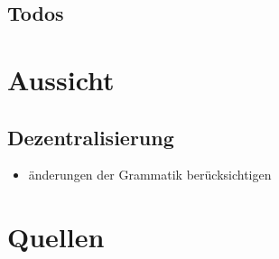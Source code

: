 \documentclass[]{article}
\begin{document}
\subsection*{Todos}

\listoftodos[Notes]




\section{Aussicht}

\subsection{Dezentralisierung}

\begin{itemize}
  \item änderungen der Grammatik berücksichtigen
\end{itemize}




\newpage
\section{Quellen}





\end{document}
